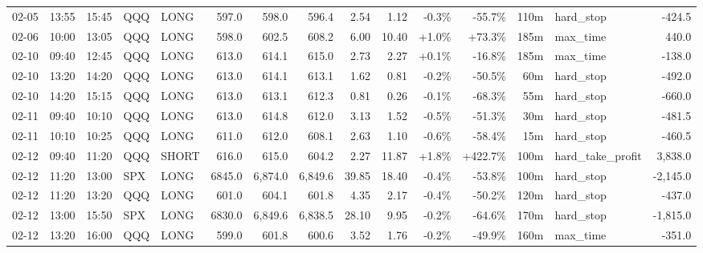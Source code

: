 \documentclass[11pt,a4paper,twoside]{article}
\begin{document}
\begin{landscape}
\begin{center}
\begin{longtable}{>{\color{txtmain}}l l l l l r r r r r r r r >{\color{txtmain}}l r}
02-05 & 13:55 & 15:45 & QQQ & LONG & 597.0 & 598.0 & 596.4 & 2.54 & 1.12 & \textcolor{lossred}{-0.3\%} & \textcolor{lossred}{-55.7\%} & 110m & hard\_stop & \textcolor{lossred}{-424.5} \\
02-06 & 10:00 & 13:05 & QQQ & LONG & 598.0 & 602.5 & 608.2 & 6.00 & 10.40 & \textcolor{wingreen}{+1.0\%} & \textcolor{wingreen}{+73.3\%} & 185m & max\_time & \textcolor{wingreen}{440.0} \\
02-10 & 09:40 & 12:45 & QQQ & LONG & 613.0 & 614.1 & 615.0 & 2.73 & 2.27 & \textcolor{wingreen}{+0.1\%} & \textcolor{lossred}{-16.8\%} & 185m & max\_time & \textcolor{lossred}{-138.0} \\
02-10 & 13:20 & 14:20 & QQQ & LONG & 613.0 & 614.1 & 613.1 & 1.62 & 0.81 & \textcolor{lossred}{-0.2\%} & \textcolor{lossred}{-50.5\%} & 60m & hard\_stop & \textcolor{lossred}{-492.0} \\
02-10 & 14:20 & 15:15 & QQQ & LONG & 613.0 & 613.1 & 612.3 & 0.81 & 0.26 & \textcolor{lossred}{-0.1\%} & \textcolor{lossred}{-68.3\%} & 55m & hard\_stop & \textcolor{lossred}{-660.0} \\
02-11 & 09:40 & 10:10 & QQQ & LONG & 613.0 & 614.8 & 612.0 & 3.13 & 1.52 & \textcolor{lossred}{-0.5\%} & \textcolor{lossred}{-51.3\%} & 30m & hard\_stop & \textcolor{lossred}{-481.5} \\
02-11 & 10:10 & 10:25 & QQQ & LONG & 611.0 & 612.0 & 608.1 & 2.63 & 1.10 & \textcolor{lossred}{-0.6\%} & \textcolor{lossred}{-58.4\%} & 15m & hard\_stop & \textcolor{lossred}{-460.5} \\
02-12 & 09:40 & 11:20 & QQQ & SHORT & 616.0 & 615.0 & 604.2 & 2.27 & 11.87 & \textcolor{wingreen}{+1.8\%} & \textcolor{wingreen}{+422.7\%} & 100m & hard\_take\_profit & \textcolor{wingreen}{3,838.0} \\
02-12 & 11:20 & 13:00 & SPX & LONG & 6845.0 & 6,874.0 & 6,849.6 & 39.85 & 18.40 & \textcolor{lossred}{-0.4\%} & \textcolor{lossred}{-53.8\%} & 100m & hard\_stop & \textcolor{lossred}{-2,145.0} \\
02-12 & 11:20 & 13:20 & QQQ & LONG & 601.0 & 604.1 & 601.8 & 4.35 & 2.17 & \textcolor{lossred}{-0.4\%} & \textcolor{lossred}{-50.2\%} & 120m & hard\_stop & \textcolor{lossred}{-437.0} \\
02-12 & 13:00 & 15:50 & SPX & LONG & 6830.0 & 6,849.6 & 6,838.5 & 28.10 & 9.95 & \textcolor{lossred}{-0.2\%} & \textcolor{lossred}{-64.6\%} & 170m & hard\_stop & \textcolor{lossred}{-1,815.0} \\
02-12 & 13:20 & 16:00 & QQQ & LONG & 599.0 & 601.8 & 600.6 & 3.52 & 1.76 & \textcolor{lossred}{-0.2\%} & \textcolor{lossred}{-49.9\%} & 160m & max\_time & \textcolor{lossred}{-351.0} \\

\end{longtable}
\end{center}
\end{landscape}
\end{document}
